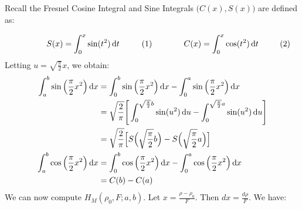         Recall the Fresnel Cosine Integral and
        Sine Integrals $\big(C(x),S(x)\big)$ are defined as:
        \par
        \begin{subequations}
            \begin{minipage}[b]{0.49\textwidth}
                \begin{equation}
                    S(x)=\int_{0}^{x}\sin(t^{2})\diff{t}
                \end{equation}
            \end{minipage}
            \hfill
            \begin{minipage}[b]{0.49\textwidth}
                \begin{equation}
                    C(x)=\int_{0}^{x}\cos(t^{2})\diff{t}
                \end{equation}
            \end{minipage}
        \end{subequations}
        Letting $u=\sqrt{\frac{\pi}{2}}x$, we obtain:
        \begin{subequations}
            \begin{align}
                \int_{a}^{b}\sin\Big(\frac{\pi}{2}x^{2}\Big)\diff{x}
                &=\int_{0}^{b}\sin\Big(\frac{\pi}{2}x^{2}\Big)\diff{x}-
                    \int_{0}^{a}\sin\Big(\frac{\pi}{2}x^{2}\Big)\diff{x}\\
                &=\sqrt{\frac{2}{\pi}}\Bigg[
                    \int_{0}^{\sqrt{\frac{\pi}{2}}b}\sin(u^{2})\diff{u}-
                    \int_{0}^{\sqrt{\frac{\pi}{2}}a}\sin(u^{2})\diff{u}
                \Bigg]\\
                &=\sqrt{\frac{2}{\pi}}\Big[
                    S\Big(\sqrt{\frac{\pi}{2}}b\Big)-
                    S\Big(\sqrt{\frac{\pi}{2}}a\Big)
                \Big]\\
                    \int_{a}^{b}\cos\Big(\frac{\pi}{2}x^{2}\Big)\diff{x}
                &=\int_{0}^{b}\cos\Big(\frac{\pi}{2}x^{2}\Big)\diff{x}-
                    \int_{0}^{a}\cos\Big(\frac{\pi}{2}x^{2}\Big)\diff{x}\\
                &=C(b)-C(a)
            \end{align}
        \end{subequations}
        We can now compute
        $H_{M}(\rho_0,F;a,b)$.
        Let $x=\frac{\rho-\rho_0}{F}$. Then $dx = \frac{d\rho}{F}$.
        We have:
